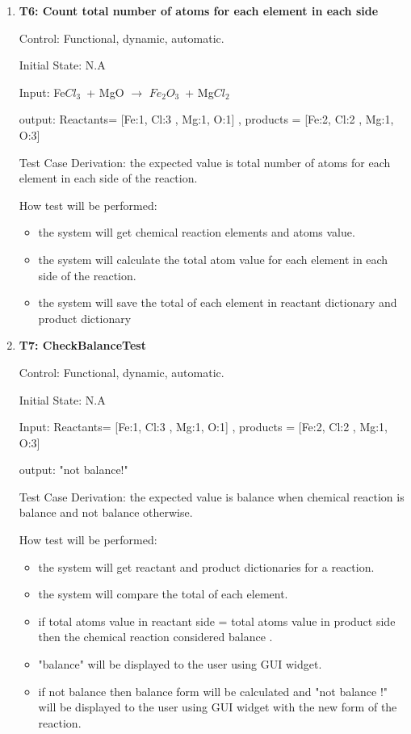 \documentclass[12pt, titlepage]{article}
\begin{document}
\begin{enumerate}

\item{\bf T6: Count total number of atoms for each element in each side\\}

Control: Functional, dynamic, automatic.
					
Initial State: N.A
					
Input: Fe$Cl_3$ + MgO $\rightarrow$ $Fe_2$$O_3$ + Mg$Cl_2$ 

output: Reactants= [Fe:1, Cl:3 , Mg:1, O:1] , products = [Fe:2, Cl:2 , Mg:1, O:3] 
 
Test Case Derivation: the expected value is total number of atoms for each element in each side of the reaction. 

How test will be performed: 
\begin{itemize}
\item the system will get chemical reaction elements and atoms value. 
\item the system will calculate the total atom value for each element in each side of the reaction. 
\item the system will save the total of each element in reactant dictionary and product dictionary
\end{itemize}


\item{\bf T7: CheckBalanceTest\\}

Control: Functional, dynamic, automatic.
					
Initial State: N.A
					
Input: Reactants= [Fe:1, Cl:3 , Mg:1, O:1] , products = [Fe:2, Cl:2 , Mg:1, O:3] 

output: "not balance!"

Test Case Derivation: the expected value is balance when chemical reaction is balance and not balance otherwise. 

How test will be performed: 
\begin{itemize}
\item the system will get reactant  and product dictionaries for a reaction. 
\item the system will compare the total of each element.
\item if total atoms value in reactant side = total atoms value in product side then the chemical reaction considered balance .
\item "balance" will be displayed to the user using GUI widget. 
\item if not balance then balance form will be calculated and "not balance !" will be displayed to the user using GUI widget with the new form of the reaction.
\end{itemize}


\end{enumerate}
\end{document}
